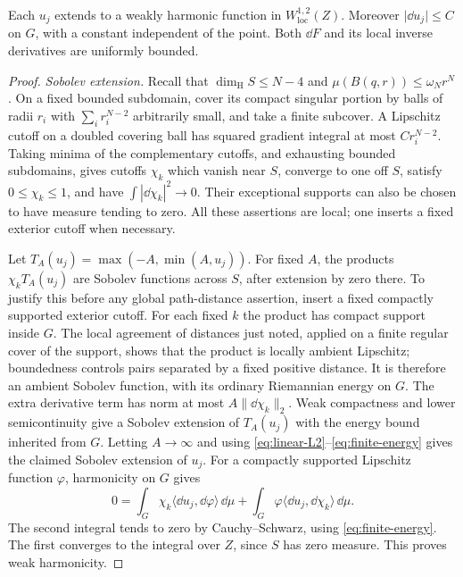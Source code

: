 \begin{lemma}\label{lem:capacity-extension}
Each $u_j$ extends to a weakly harmonic function in
$W^{1,2}_{\mathrm{loc}}(Z)$. Moreover $\lvert\dd u_j\rvert\le C$ on $G$,
with a constant independent of the point. Both $\dd F$ and its local
inverse derivatives are uniformly bounded.
\end{lemma}
\begin{proof}
\emph{Sobolev extension.}
Recall that $\dim_{\mathrm H}S\le N-4$ and
$\mu(B(q,r))\le\omega_Nr^N$. On a fixed bounded subdomain, cover its
compact singular portion by balls of radii $r_i$ with
$\sum_i r_i^{N-2}$ arbitrarily small, and take a finite subcover.
A Lipschitz cutoff on a doubled
covering ball has squared gradient integral at most $C r_i^{N-2}$.
Taking minima of the complementary cutoffs, and exhausting bounded
subdomains, gives cutoffs $\chi_k$ which vanish near $S$, converge
to one off $S$, satisfy $0\le\chi_k\le1$, and have
$\int|\dd\chi_k|^2\to0$. Their exceptional supports can also be
chosen to have measure tending to zero. All these assertions are local;
one inserts a fixed exterior cutoff when necessary.

Let $T_A(u_j)=\max(-A,\min(A,u_j))$. For fixed $A$, the products
$\chi_kT_A(u_j)$ are Sobolev functions across $S$, after extension
by zero there. To justify this before any global path-distance
assertion, insert a fixed compactly supported exterior cutoff.
For each fixed $k$ the product has compact support inside $G$.
The local agreement of distances just noted, applied on a finite
regular cover of the support, shows that the product is locally
ambient Lipschitz;
boundedness controls pairs separated by a fixed positive distance.
It is therefore an ambient Sobolev function, with its ordinary
Riemannian energy on $G$. The extra derivative term has norm at most
$A\|\dd\chi_k\|_2$. Weak compactness and lower semicontinuity give a
Sobolev extension of $T_A(u_j)$ with the energy bound inherited from
$G$. Letting $A\to\infty$ and using
\eqref{eq:linear-L2}--\eqref{eq:finite-energy} gives the claimed
Sobolev extension of $u_j$.
For a compactly supported Lipschitz function $\varphi$, harmonicity
on $G$ gives
\[
 0=\int_G \chi_k\langle\dd u_j,\dd\varphi\rangle\,\dd\mu
       +\int_G\varphi\langle\dd u_j,\dd\chi_k\rangle\,\dd\mu .
\]
The second integral tends to zero by Cauchy--Schwarz, using
\eqref{eq:finite-energy}. The first converges to the integral over
$Z$, since $S$ has zero measure. This proves weak harmonicity.


\end{proof}
